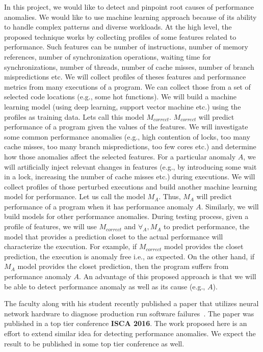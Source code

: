 \documentclass[times, 11pt, letterpaper]{article}
\begin{document}
In this project, we would like to detect and pinpoint root causes of performance anomalies.
We would like to use machine learning approach because of its ability to handle complex
patterns and diverse workloads.
At the high level, the proposed technique works by collecting profiles of some features related to performance. Such
features can be number of instructions, number of memory references, number of synchronization
operations, waiting time for synchronizations, number of threads, 
number of cache misses, number of branch
mispredictions etc. We will collect profiles of theses features and performance metrics from many executions of a program.
We can collect those from a set of selected code locations (e.g., some hot functions).
We will build a machine learning model (using deep learning, support vector machine etc.) using
the profiles as training data. Lets call this model $M_{correct}$. $M_{correct}$ will predict performance
of a program given the values of the features. We will investigate some common
performance anomalies (e.g., high contention of locks, too many cache misses, too many branch
mispredictions, too few cores etc.) and determine how those anomalies affect the selected features.
For a particular anomaly $A$, we will artificially inject relevant changes in features (e.g., by introducing some wait
in a lock, increasing the number of cache misses etc.) during executions. We will collect profiles of
those perturbed executions and build another machine learning model for performance. Let us call
the model $M_A$. Thus, $M_A$ will predict performance of a program when it has 
performance anomaly $A$. Similarly, we will build models for other performance anomalies.
During testing process, given a profile of features, we will use $M_{correct}$ and $\forall_A,M_A$ 
to predict performance, the model that provides a prediction closet to the actual performance
will characterize the execution.
For example, if $M_{correct}$ model provides the closet prediction, the execution is anomaly free i.e., as expected.
On the other hand, if $M_A$ model provides the closet prediction, then the program suffers from 
performance anomaly $A$. An advantage of this proposed approach is that we will be able to detect
performance anomaly as well as its cause (e.g., $A$).

The faculty along with his student recently published a paper that utilizes neural network
hardware to diagnose production run software failures~\cite{act}. The paper was
published in a top tier conference {\bf ISCA 2016}. The work proposed here is
an effort to extend similar idea for detecting performance anomalies. We expect
the result to be published in some top tier conference as well.




\end{document}
